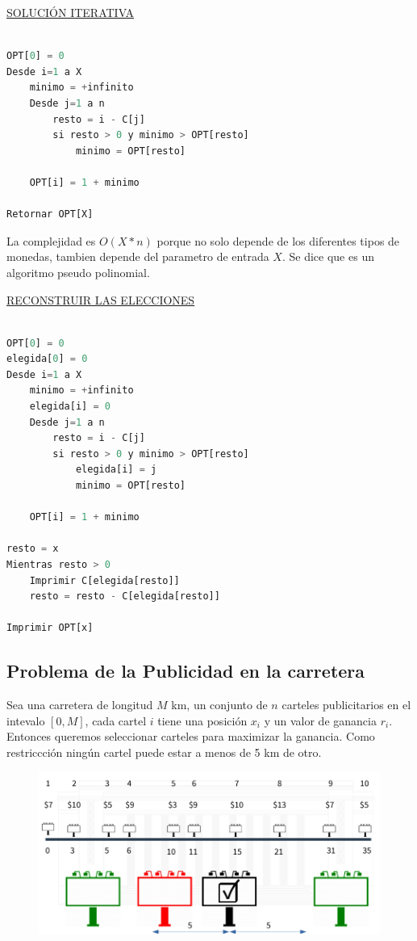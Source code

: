 \documentclass{article}
\begin{document}
\noindent
\underline{SOLUCIÓN ITERATIVA}
\begin{lstlisting}[language=Python, caption=Solución iterativa]

OPT[0] = 0
Desde i=1 a X
    minimo = +infinito
    Desde j=1 a n
        resto = i - C[j]
        si resto > 0 y minimo > OPT[resto]
            minimo = OPT[resto]
    
    OPT[i] = 1 + minimo

Retornar OPT[X]
\end{lstlisting}

La complejidad es \(O(X*n)\) porque no solo depende de los diferentes tipos de monedas, tambien
depende del parametro de entrada \(X\). Se dice que es un algoritmo pseudo polinomial.

\noindent
\underline{RECONSTRUIR LAS ELECCIONES}

\begin{lstlisting}[language=Python, caption=Solución iterativa con reconstrucción]

OPT[0] = 0
elegida[0] = 0
Desde i=1 a X
    minimo = +infinito
    elegida[i] = 0
    Desde j=1 a n
        resto = i - C[j]
        si resto > 0 y minimo > OPT[resto]
            elegida[i] = j
            minimo = OPT[resto]
    
    OPT[i] = 1 + minimo

resto = x
Mientras resto > 0
    Imprimir C[elegida[resto]]
    resto = resto - C[elegida[resto]]

Imprimir OPT[x]

\end{lstlisting}

\newpage
\subsection{Problema de la Publicidad en la carretera}

Sea una carretera de longitud \(M\) km, un conjunto de \(n\) carteles publicitarios en el 
intevalo \([0,M]\), cada cartel \(i\) tiene una posición \(x_i\) y un valor de ganancia \(r_i\).
Entonces queremos seleccionar carteles para maximizar la ganancia. Como restriccción ningún cartel
puede estar a menos de 5 km de otro.

\begin{figure}[h!]
    \includegraphics[scale=0.4]{imagenes/dinamico-ejemplo-ruta.png}
\end{figure}
\end{document}
